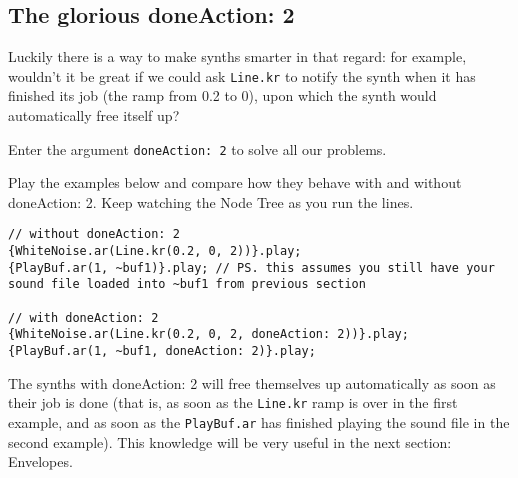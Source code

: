 \subsection{The glorious doneAction: 2}

Luckily there is a way to make synths smarter in that regard: for example, wouldn't it be great if we could ask \texttt{Line.kr} to notify the synth when it has finished its job (the ramp from 0.2 to 0), upon which the synth would automatically free itself up?

Enter the argument \texttt{doneAction: 2} to solve all our problems.

Play the examples below and compare how they behave with and without doneAction: 2. Keep watching the Node Tree as you run the lines.
 
\begin{lstlisting}[style=SuperCollider-IDE, basicstyle=\scttfamily\footnotesize]
// without doneAction: 2
{WhiteNoise.ar(Line.kr(0.2, 0, 2))}.play;
{PlayBuf.ar(1, ~buf1)}.play; // PS. this assumes you still have your sound file loaded into ~buf1 from previous section

// with doneAction: 2
{WhiteNoise.ar(Line.kr(0.2, 0, 2, doneAction: 2))}.play;
{PlayBuf.ar(1, ~buf1, doneAction: 2)}.play;
\end{lstlisting}
 
The synths with doneAction: 2 will free themselves up automatically as soon as their job is done (that is, as soon as the \texttt{Line.kr} ramp is over in the first example, and as soon as the \texttt{PlayBuf.ar} has finished playing the sound file in the second example). This knowledge will be very useful in the next section: Envelopes.